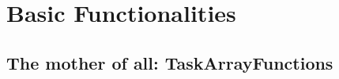 \chapter{Basic Functionalities}\label{chap:basics}
\section{The mother of all: TaskArrayFunctions}\label{sec:taskarrayfunc}
